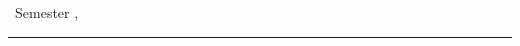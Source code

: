 \thispagestyle{plain}
\newcommand{\horrule}[1]{\rule{\linewidth}{#1}} 	%
\makeatletter 								%
\begin{center}
\huge
\textbf{\usqcoursecode{} \usqcoursedescription{}}

\vspace{0.5cm}
\Large
\@title

\vspace{0.2cm}
\small
\@date{}
\textbullet \ Semester \usqacademicsemester{}, \usqacademicyear{}


\horrule{2pt} \\[0.2cm]
	
\normalsize
\@author{}
\textbullet \ \usqstudentnumber{}
\textbullet \ \usqstudentemail{}

\vspace{0.5cm
}
\normalsize

\end{center}
\makeatother